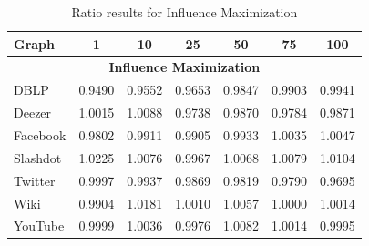 \begin{table}[ht]
\centering
\caption{Ratio results for Influence Maximization}
\label{tab:influence_maximization}
\begin{tabular}{lcccccc}
\toprule
\textbf{Graph} & 1 & 10 & 25 & 50 & 75 & 100 \\
\midrule
\multicolumn{7}{c}{\textbf{Influence Maximization}} \\
\midrule
DBLP & 0.9490 & 0.9552 & 0.9653 & 0.9847 & 0.9903 & 0.9941 \\
Deezer & 1.0015 & 1.0088 & 0.9738 & 0.9870 & 0.9784 & 0.9871 \\
Facebook & 0.9802 & 0.9911 & 0.9905 & 0.9933 & 1.0035 & 1.0047 \\
Slashdot & 1.0225 & 1.0076 & 0.9967 & 1.0068 & 1.0079 & 1.0104 \\
Twitter & 0.9997 & 0.9937 & 0.9869 & 0.9819 & 0.9790 & 0.9695 \\
Wiki & 0.9904 & 1.0181 & 1.0010 & 1.0057 & 1.0000 & 1.0014 \\
YouTube & 0.9999 & 1.0036 & 0.9976 & 1.0082 & 1.0014 & 0.9995 \\
\bottomrule
\end{tabular}
\end{table}